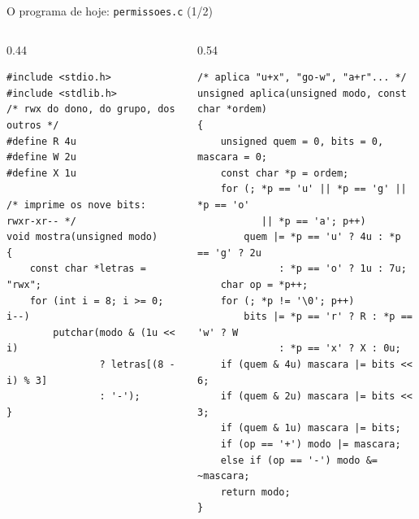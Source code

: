 \documentclass[aspectratio=169]{beamer}
\begin{document}
\begin{frame}[fragile]{O programa de hoje: \texttt{permissoes.c} (1/2)}
  \vspace{-0.8em}
  \begin{columns}[T]
    \begin{column}{0.44\textwidth}
\begin{lstlisting}[style=codCs]
#include <stdio.h>
#include <stdlib.h>
/* rwx do dono, do grupo, dos outros */
#define R 4u
#define W 2u
#define X 1u

/* imprime os nove bits: rwxr-xr-- */
void mostra(unsigned modo)
{
    const char *letras = "rwx";
    for (int i = 8; i >= 0; i--)
        putchar(modo & (1u << i)
                ? letras[(8 - i) % 3]
                : '-');
}
\end{lstlisting}
    \end{column}
    \begin{column}{0.54\textwidth}
\begin{lstlisting}[style=codCs]
/* aplica "u+x", "go-w", "a+r"... */
unsigned aplica(unsigned modo, const char *ordem)
{
    unsigned quem = 0, bits = 0, mascara = 0;
    const char *p = ordem;
    for (; *p == 'u' || *p == 'g' || *p == 'o'
           || *p == 'a'; p++)
        quem |= *p == 'u' ? 4u : *p == 'g' ? 2u
              : *p == 'o' ? 1u : 7u;
    char op = *p++;
    for (; *p != '\0'; p++)
        bits |= *p == 'r' ? R : *p == 'w' ? W
              : *p == 'x' ? X : 0u;
    if (quem & 4u) mascara |= bits << 6;
    if (quem & 2u) mascara |= bits << 3;
    if (quem & 1u) mascara |= bits;
    if (op == '+') modo |= mascara;
    else if (op == '-') modo &= ~mascara;
    return modo;
}
\end{lstlisting}
    \end{column}
  \end{columns}
\end{frame}
\end{document}
